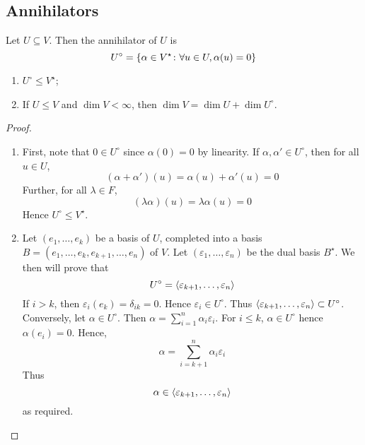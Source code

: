 \subsection{Annihilators}
\begin{definition}
	Let \( U \subseteq V \).
	Then the annihilator of \( U \) is
	\[
		U^\circ = \qty{\alpha \in V^\star \colon \forall u \in U, \alpha(u) = 0}
	\]
\end{definition}
\begin{lemma}
	\begin{enumerate}
		\item \( U^\circ \leq V^\star \);
		\item If \( U \leq V \) and \( \dim V < \infty \), then \( \dim V = \dim U + \dim U^\circ \).
	\end{enumerate}
\end{lemma}
\begin{proof}
	\begin{enumerate}
		\item First, note that \( 0 \in U^\circ \) since \( \alpha(0) = 0 \) by linearity.
		      If \( \alpha, \alpha' \in U^\circ \), then for all \( u \in U \),
		      \[
			      (\alpha + \alpha')(u) = \alpha(u) + \alpha'(u) = 0
		      \]
		      Further, for all \( \lambda \in F \),
		      \[
			      (\lambda \alpha)(u) = \lambda \alpha(u) = 0
		      \]
		      Hence \( U^\circ \leq V^\star \).
		\item Let \( (e_1, \dots, e_k) \) be a basis of \( U \), completed into a basis \( B = (e_1, \dots, e_k, e_{k+1}, \dots, e_n) \) of \( V \).
		      Let \( (\varepsilon_1, \dots, \varepsilon_n) \) be the dual basis \( B^\star \).
		      We then will prove that
		      \[
			      U^\circ = \langle{} \varepsilon_{k+1}, \dots, \varepsilon_n \rangle
		      \]
		      If \( i > k \), then \( \varepsilon_i(e_k) = \delta_{ik} = 0 \).
		      Hence \( \varepsilon_i \in U^\circ \).
		      Thus \( \langle{} \varepsilon_{k+1}, \dots, \varepsilon_n \rangle \subset U^\circ \).
		      Conversely, let \( \alpha \in U^\circ \).
		      Then \( \alpha = \sum_{i=1}^n \alpha_i \varepsilon_i \).
		      For \( i \leq k \), \( \alpha \in U^\circ \) hence \( \alpha(e_i) = 0 \).
		      Hence,
		      \[
			      \alpha = \sum_{i=k+1}^n \alpha_i \varepsilon_i
		      \]
		      Thus
		      \[
			      \alpha \in \langle{} \varepsilon_{k+1}, \dots, \varepsilon_n \rangle
		      \]
		      as required.
	\end{enumerate}
\end{proof}


